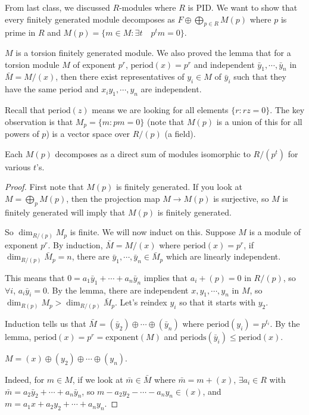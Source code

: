 \documentclass[a4paper,twoside,master.tex]{subfiles}
\begin{document}

From last class, we discussed $ R $-modules where $ R $ is PID. We want to show that every finitely generated module decomposes as $ F \oplus \bigoplus_{p \in R} M(p) $ where $ p $ is prime in $ R $ and $ M(p) = \{m \in M \colon \exists t\quad p^t m = 0\} $.

$ M $ is a torsion finitely generated module. We also proved the lemma that for a torsion module $ M $ of exponent $ p^r $, $\text{period}(x) = p^r $ and independent $ \bar{y}_1, \cdots, \bar{y}_n $ in $ \bar{M} = M / (x) $, then there exist representatives of $ y_i \in M $ of $ \bar{y}_i $ such that they have the same period and $ x_i y_1, \cdots, y_n $ are independent.

Recall that $ \text{period}(z) $ means we are looking for all elements $ \{r\colon rz = 0\}  $. The key observation is that $ M_p = \{m\colon pm = 0\} $ (note that $ M(p) $ is a union of this for all powers of $ p $) is a vector space over $ R/(p) $ (a field).

\begin{claim}
    Each $ M(p) $ decomposes as a direct sum of modules isomorphic to $ R/(p^t) $ for various $ t $'s.
\end{claim}
\begin{proof}
    First note that $ M(p) $ is finitely generated. If you look at $ M = \bigoplus_p M(p) $, then the projection map $ M \to M(p) $ is surjective, so $ M $ is finitely generated will imply that $ M(p) $ is finitely generated.

    So $ \dim_{R/(p)} M_p $ is finite. We will now induct on this. Suppose $ M $ is a module of exponent $ p^r $. By induction, $ \bar{M} = M/(x) $ where $ \text{period}(x) = p^r $, if $ \dim_{R/(p)} \bar{M}_p = n $, there are $ \bar{y}_1, \cdots, \bar{y}_n \in \bar{M}_p $ which are linearly independent.

    This means that $ 0 = a_1 \bar{y}_1 + \cdots + a_n \bar{y}_n $ implies that $ a_i + (p) = 0 $ in $ R/(p) $, so $ \forall i $, $ a_i \bar{y}_i = 0 $. By the lemma, there are independent $ x, y_1, \cdots, y_n $ in $ M $, so $ \dim_{R(p)} M_p > \dim_{R/(p)} \bar{M}_p $. Let's reindex $ y_i $ so that it starts with $ y_2 $.

    Induction tells us that $ \bar{M} = (\bar{y}_2) \oplus \cdots \oplus (\bar{y}_n) $ where $ \text{period}(y_i) = p^{t_i} $. By the lemma, $ \text{period}(x) = p^r = \text{exponent}(M) $ and $ \text{periods}(\bar{y}_i) \leq \text{period}(x) $.
    \begin{claim}
        $ M = (x) \oplus (y_2) \oplus \cdots \oplus (y_n) $.
    \end{claim}
    Indeed, for $ m \in M $, if we look at $ \bar{m} \in \bar{M} $ where $ \bar{m} = m + (x) $, $ \exists a_i \in R $ with $ \bar{m} = a_2 \bar{y}_2 + \cdots + a_n \bar{y}_n $, so $ m - a_2 y_2 - \cdots - a_n y_n \in (x) $, and $ m = a_1 x + a_2 y_2 + \cdots + a_n y_n $.
\end{proof}
\end{document}
